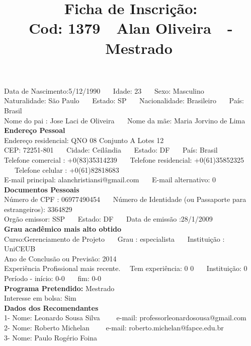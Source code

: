 \documentclass[11pt]{article}
\title{\vspace*{-4cm} Ficha de Inscrição: \\Cod: 1379\ \ Alan Oliveira\ \ - \ \ Mestrado 
 }
\date{}
\begin{document}
\maketitle
\vspace*{-1.5cm}
\noindent Data de Nascimento:5/12/1990
\ \ \ Idade: 23   \ \ \ Sexo: Masculino
\\
Naturalidade: São Paulo  
\ \ \  Estado: SP
\ \ \  Nacionalidade: Brasileiro
\ \ \ País: Brasil
\\        
Nome do pai : Jose Laci de Oliveira
\ \ \ Nome da mãe: Maria Jorvino de Lima          
\\[0.2cm]                     
\textbf{Endereço Pessoal} 
\\ 
\noindent Endereço residencial: QNO 08 Conjunto A Lotes 12
\\
        CEP: 72251-801 
\ \ \ Cidade: Ceilândia 
\ \ \ Estado: DF 
\ \ \ País: Brasil
\\		
		Telefone comercial : +0(83)35314239
\ \ \ Telefone residencial: +0(61)35852325
\ \ \ Telefone celular : +0(61)82818683
\\
E-mail principal: alanchristiansi@gmail.com
\ \ \ E-mail alternativo: 0 
\\[0.2cm] 
\textbf{Documentos Pessoais}
\\
\noindent Número de CPF : 06977490454
\ \ \ Número de Identidade (ou Passaporte para estrangeiros): 3364829
\\
Orgão emissor: SSP
\ \ \ Estado: DF
\ \ \ Data de emissão :28/1/2009
\\[0.3cm]
\textbf{Grau acadêmico mais alto obtido}
\\	
Curso:Gerenciamento de Projeto
\ \ \ Grau : especialista
\ \ \ Instituição : UniCEUB
\\			
Ano de Conclusão ou Previsão: 2014
\\ 
Experiência Profissional mais recente. \ \  
Tem experiência: 0 0  
\ \ \ Instituição: 0
\\  
Período - início: 0-0
\ \ \ fim: 0-0
\\[0.2cm] 
\textbf{Programa Pretendido:} Mestrado\\
Interesse em bolsa: Sim
\\[0.3cm]		
\textbf{Dados dos Recomendantes} 
\\
1- Nome: Leonardo Sousa Silva
\ \ \ \  e-mail: professorleonardosousa@gmail.com 
\\
2- Nome: Roberto Michelan
\ \ \ \ e-mail: roberto.michelan@fapce.edu.br
\\
3- Nome: Paulo Rogério Foina
\end{document}
